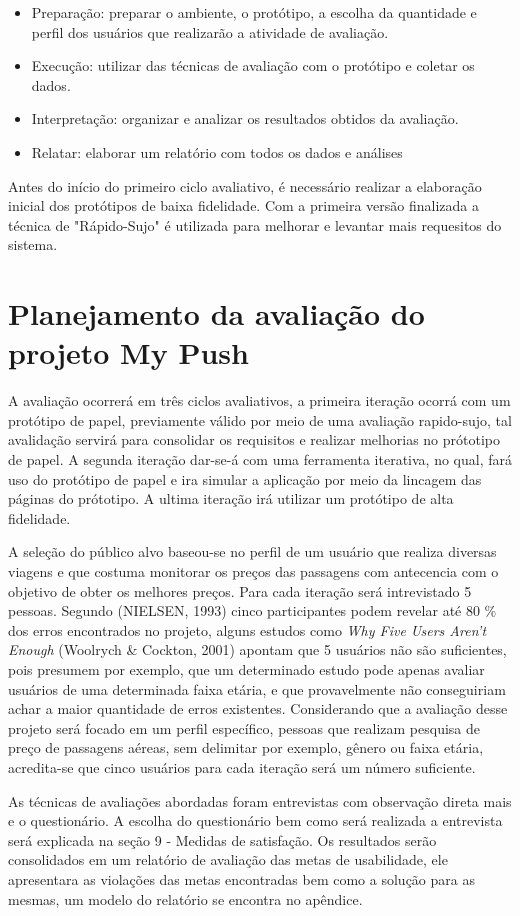 \begin{itemize}
	\item Preparação: preparar o ambiente, o protótipo, a escolha da quantidade e perfil dos usuários que realizarão a atividade de avaliação.
	\item Execução: utilizar das técnicas de avaliação com o protótipo e coletar os dados.
	\item Interpretação: organizar e analizar os resultados obtidos da avaliação.
	\item Relatar: elaborar um relatório com todos os dados e análises
\end{itemize}

Antes do início do primeiro ciclo avaliativo, é necessário realizar a elaboração inicial dos protótipos de baixa fidelidade. Com a primeira versão finalizada a técnica de "Rápido-Sujo" é utilizada para melhorar e levantar mais requesitos do sistema.

\section{Planejamento da avaliação do projeto My Push}

A avaliação ocorrerá em três ciclos avaliativos, a primeira iteração ocorrá com um protótipo de papel, previamente válido por meio de uma avaliação rapido-sujo, tal avalidação servirá para consolidar os requisitos e realizar melhorias no prótotipo de papel. A segunda iteração dar-se-á com uma ferramenta iterativa, no qual, fará uso do protótipo de papel e ira simular a aplicação por meio da lincagem das páginas do prótotipo. A ultima iteração irá utilizar um protótipo de alta fidelidade.

A seleção do público alvo baseou-se no perfil de um usuário que realiza diversas viagens e que costuma monitorar os preços das passagens com antecencia com o objetivo de obter os melhores preços. Para cada iteração será intrevistado 5 pessoas. Segundo (NIELSEN, 1993) cinco participantes podem revelar até 80 \% dos erros encontrados no projeto, alguns estudos como \textit{Why Five Users Aren't Enough} (Woolrych \& Cockton, 2001) apontam que 5 usuários não são suficientes, pois presumem por exemplo, que um determinado estudo pode apenas avaliar usuários de uma determinada faixa etária, e que provavelmente não conseguiriam achar a maior quantidade de erros existentes. Considerando que a avaliação desse projeto será focado em um perfil específico, pessoas que realizam pesquisa de preço de passagens aéreas, sem delimitar por exemplo, gênero ou faixa etária, acredita-se que cinco usuários para cada iteração será um número suficiente.

As técnicas de avaliações abordadas foram entrevistas com observação direta mais e o questionário. A escolha do questionário bem como será realizada a entrevista será explicada na seção 9 - Medidas de satisfação. Os resultados serão consolidados em um relatório de avaliação das metas de usabilidade, ele apresentara as violações das metas encontradas bem como a solução para as mesmas, um modelo do relatório se encontra no apêndice.

